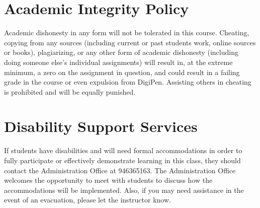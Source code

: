 \documentclass[12pt]{article}
\begin{document}
\vspace{5 mm}

\section*{Academic Integrity Policy}

Academic dishonesty in any form will not be tolerated in this course. Cheating, copying from any sources (including current or past students work, online sources 
or books), plagiarizing, or any other form of academic dishonesty (including doing someone else’s individual assignments) will result in, at the extreme minimum,
 a zero on the assignment in question, and could result in a failing grade in the course or even expulsion from DigiPen. Assisting others in cheating is prohibited 
 and will be equally punished.

\section*{Disability Support Services}

If students have disabilities and will need formal accommodations in order to fully participate or effectively demonstrate learning in this class, they should 
contact the Administration Office at 946365163. The Administration Office welcomes the opportunity to meet with students to discuss how the accommodations will
 be implemented. Also, if you may need assistance in the event of an evacuation, please let the instructor know. 








\end{document}
